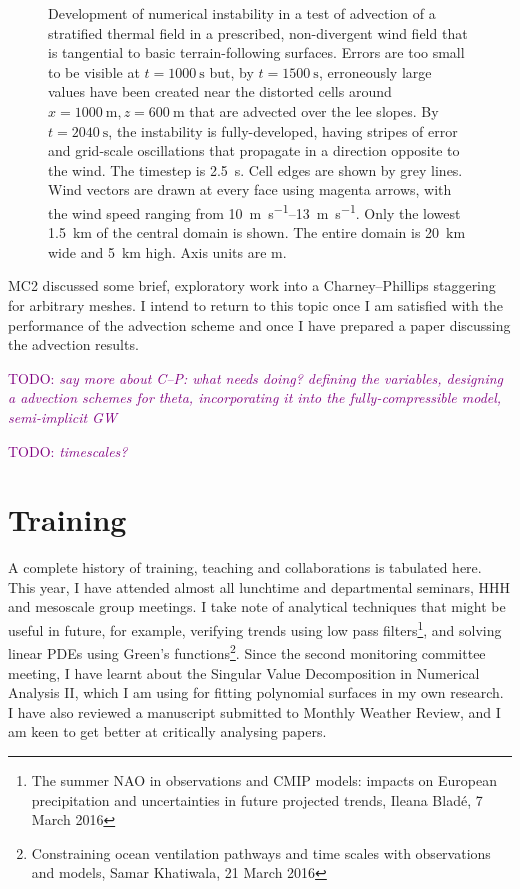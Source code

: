 \documentclass[a4paper,11pt]{article}
\newcommand{\TODO}[1]{\textcolor{purple}{TODO: \emph{#1}}}
\begin{document}
\begin{figure}
%
\caption{Development of numerical instability in a test of advection of a stratified thermal field in a prescribed, non-divergent wind field that is tangential to basic terrain-following surfaces.  Errors are too small to be visible at $t = \SI{1000}{\second}$ but, by $t = \SI{1500}{\second}$, erroneously large values have been created near the distorted cells around $x = \SI{1000}{\meter}, z = \SI{600}{\meter}$ that are advected over the lee slopes.  By $t = \SI{2040}{\second}$, the instability is fully-developed, having stripes of error and grid-scale oscillations that propagate in a direction opposite to the wind.  The timestep is \SI{2.5}{\second}.
Cell edges are shown by grey lines.  Wind vectors are drawn at every face using magenta arrows, with the wind speed ranging from \SIrange{10}{13}{\meter\per\second}.  Only the lowest \SI{1.5}{\kilo\meter} of the central domain is shown.  The entire domain is \SI{20}{\kilo\meter} wide and \SI{5}{\kilo\meter} high.  Axis units are \si{\meter}.}
\label{fig:instability}
\end{figure}

MC2 discussed some brief, exploratory work into a Charney--Phillips staggering for arbitrary meshes.  I intend to return to this topic once I am satisfied with the performance of the advection scheme and once I have prepared a paper discussing the advection results.

\TODO{say more about C--P: what needs doing? defining the variables, designing a advection schemes for theta, incorporating it into the fully-compressible model, semi-implicit GW}

\TODO{timescales?}

\section{Training}
A complete history of training, teaching and collaborations is tabulated here.  
This year, I have attended almost all lunchtime and departmental seminars, HHH and mesoscale group meetings.  I take note of analytical techniques that might be useful in future, for example, verifying trends using low pass filters\footnote{The summer NAO in observations and CMIP models: impacts on European precipitation and uncertainties in future projected trends, Ileana Bladé, 7 March 2016}, and solving linear PDEs using Green's functions\footnote{Constraining ocean ventilation pathways and time scales with observations and models, Samar Khatiwala, 21 March 2016}.
Since the second monitoring committee meeting, I have learnt about the Singular Value Decomposition in Numerical Analysis II, which I am using for fitting polynomial surfaces in my own research.
I have also reviewed a manuscript submitted to Monthly Weather Review, and I am keen to get better at critically analysing papers.
\end{document}
